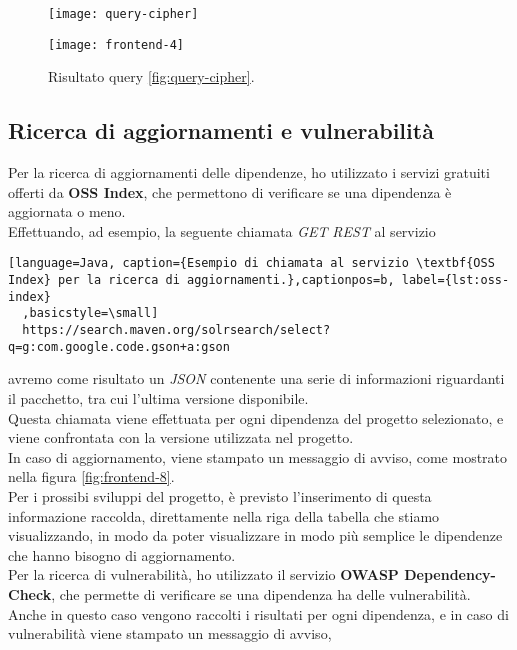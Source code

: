 \begin{figure}[h]
  \centering
  \begin{minipage}{0.550\textwidth}
      \centering
      \texttt{[image: query-cipher]} 
      \caption{Esempio di \textit{query} Cypher per l'esplorazione dell'albero delle dipendenze.}
      \label{fig:query-cipher}
  \end{minipage}\hfill
  \begin{minipage}{0.450\textwidth}
    \centering
    \texttt{[image: frontend-4]}
    \caption{Risultato query \ref*{fig:query-cipher}.}
    \label{fig:frontend-4-bis}
  \end{minipage}
\end{figure}

\subsection*{Ricerca di aggiornamenti e vulnerabilità}
Per la ricerca di aggiornamenti delle dipendenze, ho utilizzato i servizi gratuiti offerti da \textbf{OSS Index},
che permettono di verificare se una dipendenza è aggiornata o meno.\\
Effettuando, ad esempio, la seguente chiamata \textit{GET} \textit{REST} al servizio \\
\begin{lstlisting}[language=Java, caption={Esempio di chiamata al servizio \textbf{OSS Index} per la ricerca di aggiornamenti.},captionpos=b, label={lst:oss-index}
  ,basicstyle=\small]
  https://search.maven.org/solrsearch/select?q=g:com.google.code.gson+a:gson
\end{lstlisting}
avremo come risultato un \textit{JSON} contenente una serie di informazioni riguardanti il pacchetto, tra cui
l'ultima versione disponibile.\\

Questa chiamata viene effettuata per ogni dipendenza del progetto selezionato, e viene confrontata con la versione utilizzata nel progetto.\\
In caso di aggiornamento, viene stampato un messaggio di avviso, come mostrato nella figura \ref{fig:frontend-8}.\\

Per i prossibi sviluppi del progetto, è previsto l'inserimento di questa informazione raccolda, direttamente nella riga della tabella 
che stiamo visualizzando, in modo da poter visualizzare in modo più semplice le dipendenze che hanno bisogno di aggiornamento.\\

Per la ricerca di vulnerabilità, ho utilizzato il servizio \textbf{OWASP Dependency-Check}, che permette di verificare se una dipendenza
ha delle vulnerabilità.\\
Anche in questo caso vengono raccolti i risultati per ogni dipendenza, e in caso di vulnerabilità viene stampato un messaggio di avviso,